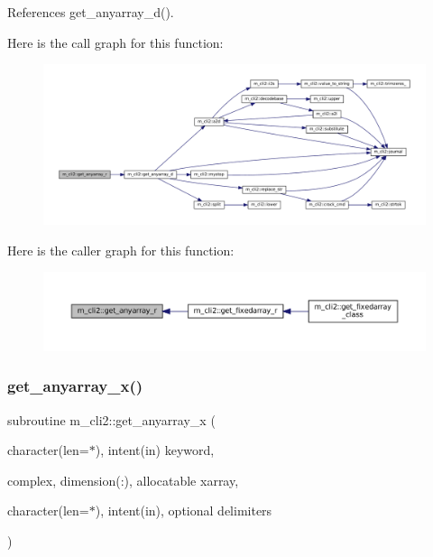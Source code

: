 References get\+\_\+anyarray\+\_\+d().

Here is the call graph for this function\+:
\nopagebreak
\begin{figure}[H]
\begin{center}
\leavevmode
\includegraphics[width=350pt]{namespacem__cli2_a8f1d5223b075f23d513c94548a1ebf09_cgraph}
\end{center}
\end{figure}
Here is the caller graph for this function\+:\nopagebreak
\begin{figure}[H]
\begin{center}
\leavevmode
\includegraphics[width=350pt]{namespacem__cli2_a8f1d5223b075f23d513c94548a1ebf09_icgraph}
\end{center}
\end{figure}
\mbox{\label{namespacem__cli2_ab9ab288fa5f108beeb7c94d81b223b7c}} 
\subsubsection{\texorpdfstring{get\+\_\+anyarray\+\_\+x()}{get\_anyarray\_x()}}
{\footnotesize\ttfamily subroutine m\+\_\+cli2\+::get\+\_\+anyarray\+\_\+x (\begin{DoxyParamCaption}\item[{character(len=$\ast$), intent(in)}]{keyword,  }\item[{complex, dimension(\+:), allocatable}]{xarray,  }\item[{character(len=$\ast$), intent(in), optional}]{delimiters }\end{DoxyParamCaption})\hspace{0.3cm}{\ttfamily [private]}}




